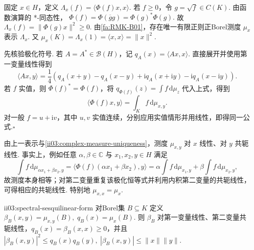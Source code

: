 \begin{FAProof}
固定 \(\displaystyle x\in H\)，定义
\(\displaystyle \Lambda_x(f)=\langle\Phi(f)x,x\rangle.\)
若 \(\displaystyle f\geqslant0\)，令 \(\displaystyle g=\sqrt f\in C(K)\). 由函数演算的 *-同态性，
\(\displaystyle \Phi(f)=\Phi(\overline g g)=\Phi(g)^*\Phi(g).\)
故
\(\displaystyle \Lambda_x(f)=\|\Phi(g)x\|^2\geqslant0.\)
由\autoref{fa:RMK-B01}，存在唯一有限正则正Borel测度 \(\displaystyle\mu_x\) 表示 \(\displaystyle\Lambda_x\). 又
\(\displaystyle \mu_x(K)=\Lambda_x(1)=\langle x,x\rangle=\|x\|^2.\)

先核验极化符号. 若 \(\displaystyle A=A^*\in\mathcal B(H)\)，记 \(\displaystyle q_A(x)=\langle Ax,x\rangle\). 直接展开并使用第一变量线性得到
\[
\langle Ax,y\rangle
=\frac14\left(
q_A(x+y)-q_A(x-y)
+\mathrm{i}q_A(x+\mathrm{i}y)
-\mathrm{i}q_A(x-\mathrm{i}y)
\right).
\]
若 \(\displaystyle f\) 实值，则 \(\displaystyle\Phi(f)^*=\Phi(f)\)，将 \(\displaystyle q_{\Phi(f)}(z)=\int f\,\mathrm{d}\mu_z\) 代入上式，得到
\[
\langle\Phi(f)x,y\rangle
=\int_K f\,\mathrm{d}\mu_{x,y}.
\]
对一般 \(\displaystyle f=u+\mathrm{i}v\)，其中 \(\displaystyle u,v\) 实值连续，分别应用实值情形并用线性，即得同一公式.\hfill\(\square\)
\end{FAProof}

由上一表示与\autoref{ii03:complex-measure-uniqueness}，测度 \(\displaystyle\mu_{x,y}\) 对 \(\displaystyle x\) 线性、对 \(\displaystyle y\) 共轭线性. 事实上，例如任意 \(\displaystyle\alpha,\beta\in\mathbb C\) 与 \(\displaystyle x_1,x_2,y\in H\) 满足
\[
\int f\,\mathrm{d}\mu_{\alpha x_1+\beta x_2,y}
=\langle\Phi(f)(\alpha x_1+\beta x_2),y\rangle
=\alpha\int f\,\mathrm{d}\mu_{x_1,y}
+\beta\int f\,\mathrm{d}\mu_{x_2,y},
\]
故测度本身相等；对第二变量重复该极化恒等式并利用内积第二变量的共轭线性，可得相应的共轭线性. 特别地 \(\displaystyle\mu_{x,x}=\mu_x\).

\begin{FAProposition}[B][Borel集上的有界半双线性型]{ii03:spectral-sesquilinear-form}
对Borel集 \(\displaystyle B\subseteq K\) 定义
\(\displaystyle \beta_B(x,y)=\mu_{x,y}(B), \; q_B(x)=\mu_x(B).\)
则 \(\displaystyle\beta_B\) 对第一变量线性、第二变量共轭线性，\(\displaystyle q_B(x)=\beta_B(x,x)\geqslant0\)，并且
\(\displaystyle |\beta_B(x,y)|^2\leqslant q_B(x)q_B(y), \; |\beta_B(x,y)|\leqslant\|x\|\|y\|.\)
\end{FAProposition}


